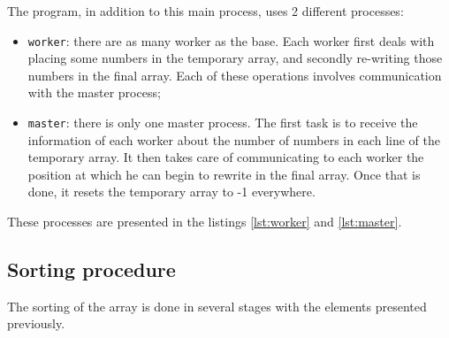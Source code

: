 \documentclass[a4paper, 12pt]{article}
\begin{document}
	
	
	The program, in addition to this main process, uses 2 different processes:
	
	\begin{itemize}
	    \item \texttt{worker}: there are as many worker as the base. Each worker first deals with placing some numbers in the temporary array, and secondly re-writing those numbers in the final array. Each of these operations involves communication with the master process;
	    \item \texttt{master}: there is only one master process. The first task is to receive the information of each worker about the number of numbers in each line of the temporary array. It then takes care of communicating to each worker the position at which he can begin to rewrite in the final array. Once that is done, it resets the temporary array to -1 everywhere.
	\end{itemize}
	
	These processes are presented in the listings \ref{lst:worker} and \ref{lst:master}.\par
	
	
	
	
	\subsection{Sorting procedure}
	The sorting of the array is done in several stages with the elements presented previously.
	
\end{document}
